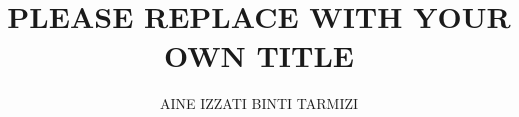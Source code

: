 \documentclass[urlsf]{utemclass}
\author{AINE IZZATI BINTI TARMIZI}
\title{PLEASE REPLACE WITH YOUR OWN TITLE}
\begin{document}
	 
	
	\lstset{fontadjust=true}

	\frontmatter

	\makecover


	\ifpdf
	\else\fi

	\setcounter{page}{0} %
	
	\setcounter{page}{0}
	
	\setcounter{page}{0}
	
	
	
    \newpage
 	
	 
    
	\renewcommand\contentsname{Table of Contents}
	\newcommand\tocheading{\par\bigskip\MakeUppercase{\chaptername}\hfill Page\par}
	\renewcommand{\listfigurename}{List of Figures}
	\renewcommand{\listtablename}{List of Tables}
		\begin{singlespace}
			\tableofcontents \clearpage
			\listoftables \clearpage
			\listoffigures \clearpage
			
		\end{singlespace}
		
\end{document}
